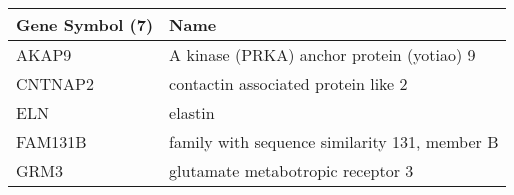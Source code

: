 \begin{tabular}{ll}
\toprule
Gene Symbol (7) &                                          Name \\
\midrule
          AKAP9 &     A kinase (PRKA) anchor protein (yotiao) 9 \\
        CNTNAP2 &           contactin associated protein like 2 \\
            ELN &                                       elastin \\
        FAM131B & family with sequence similarity 131, member B \\
           GRM3 &             glutamate metabotropic receptor 3 \\
\bottomrule
\end{tabular}
